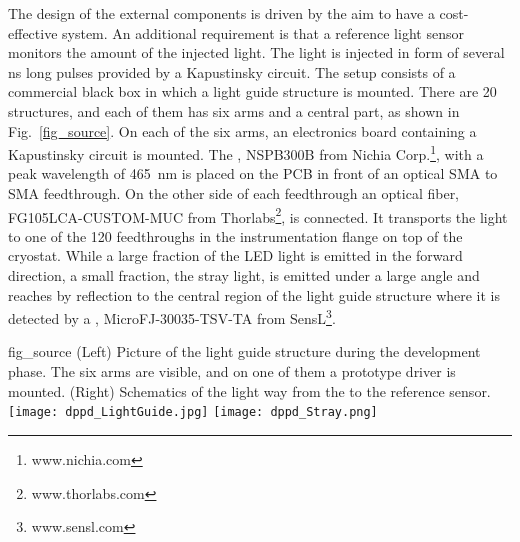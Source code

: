 The design of the external components is driven by the aim to have a cost-effective system. An additional requirement is that a reference light sensor monitors the amount of the injected light. The light is injected in form of several \si{\ns} long pulses provided by a Kapustinsky circuit. The setup consists of a commercial black box in which a light guide structure is mounted. There are \num{20} structures, and each of them has six arms and a central part, as shown in Fig.~\ref{fig_source}. On each of the six arms, an electronics board containing a Kapustinsky circuit is mounted. The , NSPB300B from Nichia Corp.\footnote{www.nichia.com}, with a peak wavelength of \SI{465}{nm} is placed  on the PCB in front of an optical SMA to SMA feedthrough. On the other side of each feedthrough an optical fiber, FG105LCA-CUSTOM-MUC from Thorlabs\footnote{www.thorlabs.com}, is connected. It transports the light to one of the \num{120} feedthroughs in the instrumentation flange on top of the cryostat. While a large fraction of the LED light is emitted in the forward direction, a small fraction, the stray light, is emitted under a large angle and reaches by reflection to the central region of the light guide structure where it is detected by a , MicroFJ-30035-TSV-TA from SensL\footnote{www.sensl.com}.



\begin{dunefigure}{fig_source}
{(Left) Picture of the light guide structure during the development phase. The six arms are visible, and on one of them a prototype  driver is mounted. (Right) Schematics of the light way from the  to the reference sensor.}
\texttt{[image: dppd\_LightGuide.jpg]}
\texttt{[image: dppd\_Stray.png]}
\end{dunefigure}




